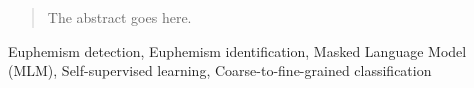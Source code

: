 \begin{abstract}
The abstract goes here.
\end{abstract}

\begin{IEEEkeywords}
	Euphemism detection, Euphemism identification, Masked Language Model (MLM), Self-supervised learning, Coarse-to-fine-grained classification
\end{IEEEkeywords}
